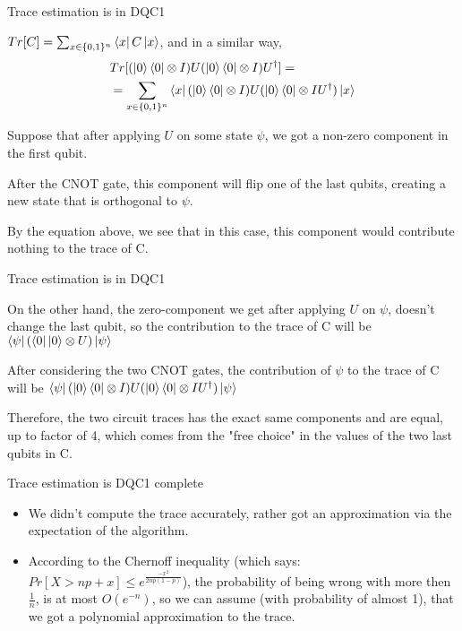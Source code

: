 \documentclass[leqno,fleqn]{beamer}
\begin{document}
\begin{frame}[label={sec:orgheadline16}]{Trace estimation is in DQC1}
\begin{block}{}
\(Tr[C] = \sum_{x \in \{0,1\}^n} \left\langle{x}\right\vert C\left\vert{x}\right\rangle\), and in a similar way,
\begin{align*}
&Tr[(\left\vert{0}\right\rangle\left\langle{0}\right\vert \otimes I)U(\left\vert{0}\right\rangle\left\langle{0}\right\vert \otimes I)U^\dagger] = \\
&= \sum_{x \in \{0,1\}^n} \left\langle{x}\right\vert(\left\vert{0}\right\rangle\left\langle{0}\right\vert\otimes I)U(\left\vert{0}\right\rangle\left\langle{0}\right\vert\otimes I{U^\dagger})\left\vert{x}\right\rangle
\end{align*}
\end{block}
\begin{block}{}
Suppose that after applying \(U\) on some state \(\psi\), we got a non-zero component in the first qubit.
\end{block}
\begin{block}{}
After the CNOT gate, this component will flip one of the last qubits, creating a new state that is orthogonal to \(\psi\).
\end{block}
\begin{block}{}
By the equation above, we see that in this case, this component would contribute nothing to the trace of C.
\end{block}
\end{frame}
\begin{frame}[label={sec:orgheadline17}]{Trace estimation is in DQC1}
\begin{block}{}
On the other hand, the zero-component we get after applying \(U\) on \(\psi\), doesn't change the last qubit, so the contribution to the trace of C will be \(\left\langle{\psi}\right\vert(\left\langle{0}\right\vert\left\vert{0}\right\rangle \otimes U)\left\vert{\psi}\right\rangle\)
\end{block}
\begin{block}{}
After considering the two CNOT gates, the contribution of \(\psi\) to the trace of C will be \(\left\langle{\psi}\right\vert(\left\vert{0}\right\rangle\left\langle{0}\right\vert\otimes I)U(\left\vert{0}\right\rangle\left\langle{0}\right\vert\otimes I{U^\dagger})\left\vert{\psi}\right\rangle\)
\end{block}
\begin{block}{}
Therefore, the two circuit traces has the exact same components and are equal, up to factor of 4, which comes from the "free choice" in the values of the two last qubits in C.
\end{block}
\end{frame}
\begin{frame}[label={sec:orgheadline18}]{Trace estimation is DQC1 complete}
\begin{itemize}
\item We didn't compute the trace accurately, rather got an approximation via the expectation of the algorithm.
\item According to the Chernoff inequality (which says: \(Pr[X > np +x] \leq e^{\frac{-x^{2}}{2np(1-p)}}\)), the probability of being wrong with more then \(\frac{1}{n}\), is at most \(O(e^{-n})\), so we can assume (with probability of almost 1), that we got a polynomial approximation to the trace.
\end{itemize}
\end{frame}
\end{document}
